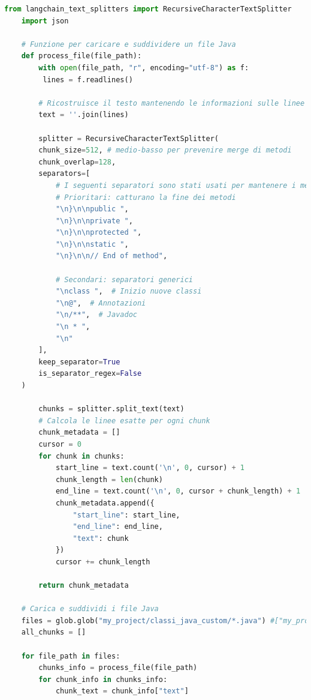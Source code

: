 \documentclass[12pt,a4paper,openright,twoside]{book}
\begin{document}
\begin{lstlisting}[language=Python, caption={Codice Python per la suddivisione dei file Java in chunk}, label={lst:chunking}, inputencoding=utf8]
    from langchain_text_splitters import RecursiveCharacterTextSplitter
    import json
    
    # Funzione per caricare e suddividere un file Java
    def process_file(file_path):
        with open(file_path, "r", encoding="utf-8") as f:
         lines = f.readlines()
    
        # Ricostruisce il testo mantenendo le informazioni sulle linee
        text = ''.join(lines)
    
        splitter = RecursiveCharacterTextSplitter(
        chunk_size=512, # medio-basso per prevenire merge di metodi
        chunk_overlap=128,
        separators=[
            # I seguenti separatori sono stati usati per mantenere i metodi uniti
            # Prioritari: catturano la fine dei metodi
            "\n}\n\npublic ",
            "\n}\n\nprivate ",
            "\n}\n\nprotected ",
            "\n}\n\nstatic ",
            "\n}\n\n// End of method", 
            
            # Secondari: separatori generici
            "\nclass ",  # Inizio nuove classi
            "\n@",  # Annotazioni
            "\n/**",  # Javadoc
            "\n * ", 
            "\n"
        ],
        keep_separator=True
        is_separator_regex=False
    )
    
        chunks = splitter.split_text(text)
        # Calcola le linee esatte per ogni chunk
        chunk_metadata = []
        cursor = 0
        for chunk in chunks:
            start_line = text.count('\n', 0, cursor) + 1
            chunk_length = len(chunk)
            end_line = text.count('\n', 0, cursor + chunk_length) + 1
            chunk_metadata.append({
                "start_line": start_line,
                "end_line": end_line,
                "text": chunk
            })
            cursor += chunk_length
        
        return chunk_metadata
    
    # Carica e suddividi i file Java
    files = glob.glob("my_project/classi_java_custom/*.java") #["my_project/DateUtilCustom.java", "my_project/GiorniMagici.java", "my_project/BasketballStats.java", "my_project/Ventunoclassi.java"]
    all_chunks = []
    
    for file_path in files:
        chunks_info = process_file(file_path)
        for chunk_info in chunks_info:
            chunk_text = chunk_info["text"]
            

\end{lstlisting}
\end{document}
